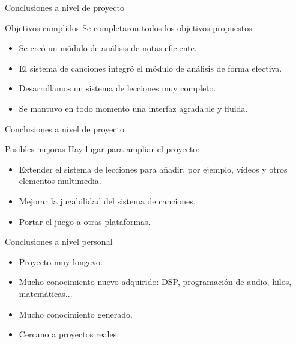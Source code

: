 \begin{frame}{Conclusiones a nivel de proyecto}
  \begin{block}{Objetivos cumplidos}
    Se completaron todos los objetivos propuestos:
    \begin{itemize}
    \item Se creó un módulo de análisis de notas eficiente.
    \item El sistema de canciones integró el módulo de análisis de forma
      efectiva.
    \item Desarrollamos un sistema de lecciones muy completo.
    \item Se mantuvo en todo momento una interfaz agradable y fluida.
    \end{itemize}    
  \end{block} 
\end{frame}

\begin{frame}{Conclusiones a nivel de proyecto}
  \begin{block}{Posibles mejoras}
    Hay lugar para ampliar el proyecto:
    \begin{itemize}
    \item Extender el sistema de lecciones para añadir, por ejemplo, vídeos y
      otros elementos multimedia.
    \item Mejorar la jugabilidad del sistema de canciones.
    \item Portar el juego a otras plataformas.
    \end{itemize}
  \end{block}  
\end{frame}

\begin{frame}{Conclusiones a nivel personal}
  \begin{itemize}
  \item Proyecto muy longevo.
  \item Mucho conocimiento nuevo adquirido: DSP, programación de audio, hilos,
    matemáticas...
  \item Mucho conocimiento generado.
  \item Cercano a proyectos reales.
  \end{itemize}
\end{frame}

